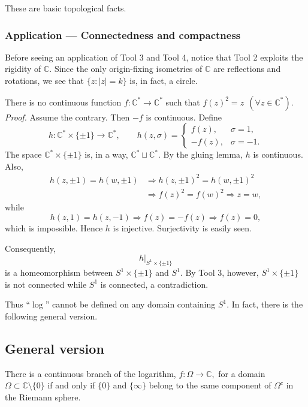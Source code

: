 \documentclass[11pt,a4paper]{article}
\begin{document}

These are basic topological facts.

\subsubsection*{Application — Connectedness and compactness}
Before seeing an application of Tool 3 and Tool 4, notice that Tool 2 exploits the rigidity of $\mathbb C$. Since the only origin-fixing isometries of $\mathbb C$ are reflections and rotations, we see that \(\{z:|z|=k\}\)
is, in fact, a circle.


There is no continuous function $f\colon\mathbb C^*\to\mathbb C^*$ such that \(f(z)^2=z\ \ (\forall z\in\mathbb C^*).\)
\textit{Proof.}
Assume the contrary. Then $-f$ is continuous. Define
\[
h\colon\mathbb C^*\times\{\pm1\}\longrightarrow\mathbb C^*,
\qquad
h(z,\sigma)=
\begin{cases}
f(z),&\sigma=1,\\
-f(z),&\sigma=-1.
\end{cases}
\]
The space $\mathbb C^*\times\{\pm1\}$ is, in a way, $\mathbb C^*\sqcup\mathbb C^*$. By the gluing lemma, $h$ is continuous. Also,
\begin{align*}
h(z,\pm1)=h(w,\pm1)
&\Longrightarrow h(z,\pm1)^2=h(w,\pm1)^2\\
&\Longrightarrow f(z)^2=f(w)^2
\Longrightarrow z=w,
\end{align*}
while
\[
h(z,1)=h(z,-1)
\Longrightarrow f(z)=-f(z)
\Longrightarrow f(z)=0,
\]
which is impossible. Hence $h$ is injective. Surjectivity is easily seen.

Consequently,
\[
h\big|_{S^1\times\{\pm1\}}
\]
is a homeomorphism between $S^1\times\{\pm1\}$ and $S^1$. By Tool 3, however, $S^1\times\{\pm1\}$ is not connected while $S^1$ is connected, a contradiction.

Thus ``$\log$'' cannot be defined on any domain containing $S^1$. In fact, there is the following general version.

\subsection*{General version}
There is a continuous branch of the logarithm, \(f\colon\Omega\longrightarrow\mathbb C,\)
for a domain $\Omega\subset\mathbb C\setminus\{0\}$ if and only if $\{0\}$ and $\{\infty\}$ belong to the same component of $\Omega^c$ in the Riemann sphere.
\end{document}
